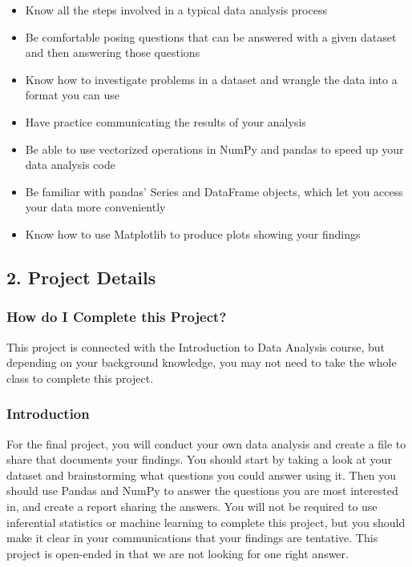 \documentclass[]{book}
\providecommand{\tightlist}{%
  \setlength{\itemsep}{0pt}\setlength{\parskip}{0pt}}
\begin{document}
\begin{itemize}
\tightlist
\item
  Know all the steps involved in a typical data analysis process
\item
  Be comfortable posing questions that can be answered with a given
  dataset and then answering those questions
\item
  Know how to investigate problems in a dataset and wrangle the data
  into a format you can use
\item
  Have practice communicating the results of your analysis
\item
  Be able to use vectorized operations in NumPy and pandas to speed up
  your data analysis code
\item
  Be familiar with pandas' Series and DataFrame objects, which let you
  access your data more conveniently
\item
  Know how to use Matplotlib to produce plots showing your findings
\end{itemize}

\subsection{2. Project Details}\label{project-details-1}

\subsubsection{How do I Complete this
Project?}\label{how-do-i-complete-this-project}

This project is connected with the Introduction to Data Analysis course,
but depending on your background knowledge, you may not need to take the
whole class to complete this project.

\subsubsection{Introduction}\label{introduction}

For the final project, you will conduct your own data analysis and
create a file to share that documents your findings. You should start by
taking a look at your dataset and brainstorming what questions you could
answer using it. Then you should use Pandas and NumPy to answer the
questions you are most interested in, and create a report sharing the
answers. You will not be required to use inferential statistics or
machine learning to complete this project, but you should make it clear
in your communications that your findings are tentative. This project is
open-ended in that we are not looking for one right answer.
\end{document}
